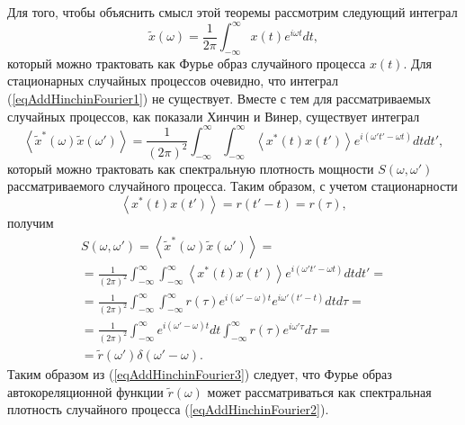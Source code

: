 Для того, чтобы объяснить смысл этой теоремы рассмотрим следующий
интеграл
\begin{equation}
\tilde{x}\left(\omega\right) = \frac{1}{2 \pi}
\int_{-\infty}^{\infty}x\left(t\right)e^{i \omega t}dt,
\label{eqAddHinchinFourier1}
\end{equation}
который можно трактовать как Фурье образ случайного процесса
$x\left(t\right)$. Для стационарных случайных процессов очевидно, что
интеграл (\ref{eqAddHinchinFourier1}) не существует. Вместе с тем для
рассматриваемых случайных процессов, как показали Хинчин и Винер,
существует интеграл
\begin{equation}
\left<\tilde{x}^{*}\left(\omega\right)\tilde{x}\left(\omega'\right)\right>
= 
\frac{1}{\left(2 \pi\right)^2}
\int_{-\infty}^{\infty}\int_{-\infty}^{\infty}\left<x^{*}\left(t\right)x\left(t'\right)\right>e^{i
  \left(\omega' t' - \omega t\right)}dtdt',
\label{eqAddHinchinFourier2}
\end{equation}
который можно трактовать как спектральную плотность мощности $S\left(\omega,\omega'\right)$
рассматриваемого случайного процесса. Таким образом, с учетом стационарности
\[
\left<x^{*}\left(t\right)x\left(t'\right)\right> = r\left(t' - t\right) = r\left(\tau\right),
\]
получим
\begin{eqnarray}
S\left(\omega, \omega'\right) =
\left<\tilde{x}^{*}\left(\omega\right)\tilde{x}\left(\omega'\right)\right>
= 
\nonumber \\
=
\frac{1}{\left(2 \pi\right)^2}
\int_{-\infty}^{\infty}\int_{-\infty}^{\infty}\left<x^{*}\left(t\right)x\left(t'\right)\right>e^{i
  \left(\omega' t' - \omega t\right)}dtdt' =
\nonumber \\
=
\frac{1}{\left(2 \pi\right)^2}
\int_{-\infty}^{\infty}\int_{-\infty}^{\infty}
r\left(\tau\right)
e^{i\left(\omega' - \omega\right) t}
e^{i\omega'\left(t' - t\right) }
dtd\tau =
\nonumber \\
=
\frac{1}{\left(2 \pi\right)^2}
\int_{-\infty}^{\infty}
e^{i \left(\omega' - \omega\right) t}dt 
\int_{-\infty}^{\infty}r\left(\tau\right)
e^{i \omega' \tau}d\tau =
\nonumber \\
= \tilde{r}\left(\omega'\right)\delta\left(\omega' - \omega\right). 
\label{eqAddHinchinFourier3}
\end{eqnarray}
Таким образом из (\ref{eqAddHinchinFourier3}) следует, что Фурье образ
автокореляционной функции $\tilde{r}\left(\omega\right)$ может
рассматриваться как спектральная плотность случайного процесса
(\ref{eqAddHinchinFourier2}). 


